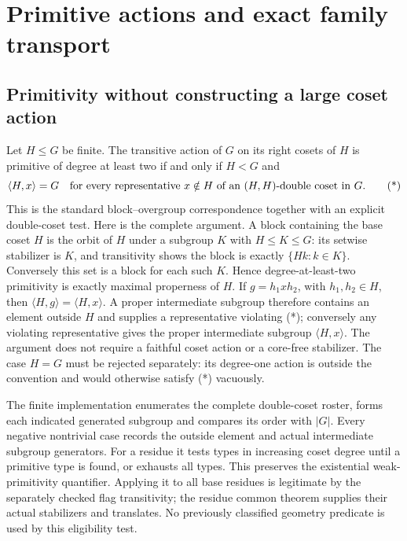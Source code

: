 \section{Primitive actions and exact family transport}
\subsection{Primitivity without constructing a large coset action}
Let $H\leq G$ be finite. The transitive action of $G$ on its right cosets
of $H$ is primitive of degree at least two if and only if $H<G$ and
\[
 \langle H,x\rangle=G
 \quad\hbox{for every representative }x\notin H
 \hbox{ of an }(H,H)\hbox{-double coset in }G.                 \tag{*}
\]
This is the standard block--overgroup correspondence together with an
explicit double-coset test. Here is the complete argument. A block
containing the base coset $H$ is the orbit of $H$ under a subgroup
$K$ with $H\leq K\leq G$: its setwise stabilizer is $K$, and transitivity
shows the block is exactly $\{Hk:k\in K\}$. Conversely this set is a
block for each such $K$. Hence degree-at-least-two primitivity is exactly
maximal properness of $H$. If $g=h_1xh_2$, with $h_1,h_2\in H$, then
$\langle H,g\rangle=\langle H,x\rangle$. A proper intermediate subgroup
therefore contains an element outside $H$ and supplies a representative
violating (*); conversely any violating representative gives the proper
intermediate subgroup $\langle H,x\rangle$. The argument does not require
a faithful coset action or a core-free stabilizer. The case $H=G$ must be
rejected separately: its degree-one action is outside the convention and
would otherwise satisfy (*) vacuously.

The finite implementation enumerates the complete double-coset roster,
forms each indicated generated subgroup and compares its order with $|G|$.
Every negative nontrivial case records the outside element and actual
intermediate subgroup generators. For a residue it tests types in
increasing coset degree until a primitive type is found, or exhausts all
types. This preserves the existential weak-primitivity quantifier.
Applying it to all base residues is legitimate by the separately checked
flag transitivity; the residue common theorem supplies their actual
stabilizers and translates. No previously classified geometry predicate
is used by this eligibility test.

